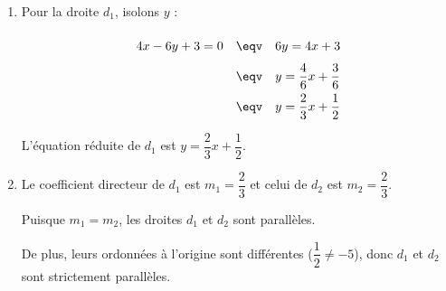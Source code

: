 \begin{correction}
	\nline
	\begin{enumerate}
		\item Pour la droite $d_1$, isolons $y$ :
		      \[
			      \def\arraystretch{2}
			      \begin{array}{rcl}
				      4x - 6y + 3 = 0 & \eqv & 6y = 4x + 3                      \\
				                      & \eqv & y = \dfrac{4}{6}x + \dfrac{3}{6} \\
				                      & \eqv & y = \dfrac{2}{3}x + \dfrac{1}{2}
			      \end{array}
		      \]

		      L'équation réduite de $d_1$ est $y = \dfrac{2}{3}x + \dfrac{1}{2}$.

		\item Le coefficient directeur de $d_1$ est $m_1 = \dfrac{2}{3}$ et celui de $d_2$ est $m_2 = \dfrac{2}{3}$.

		      Puisque $m_1 = m_2$, les droites $d_1$ et $d_2$ sont parallèles.

		      De plus, leurs ordonnées à l'origine sont différentes ($\dfrac{1}{2} \neq -5$), donc $d_1$ et $d_2$ sont strictement parallèles.
	\end{enumerate}
\end{correction}
